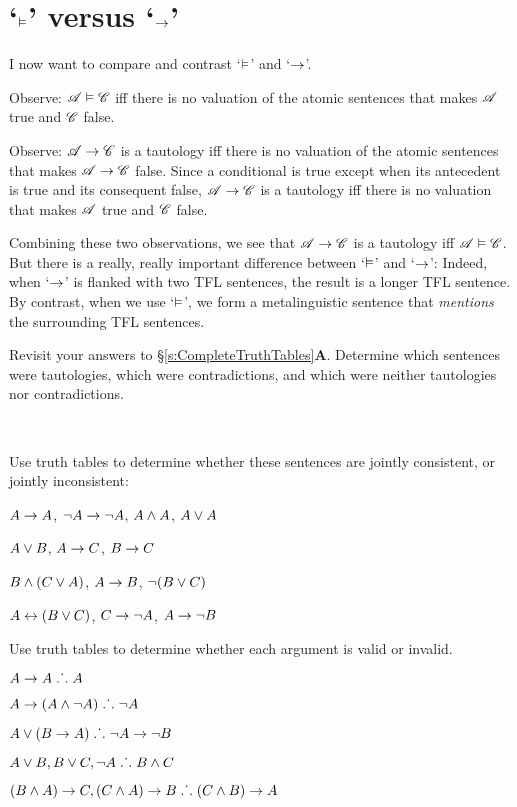 \section{`$\vDash$' versus `$\rightarrow$'}
I now want to compare and contrast `$\vDash$' and `$\rightarrow$'. 

Observe: $\mathscr{A} \vDash \mathscr{C}$ iff there is no valuation of the atomic sentences that makes $\mathscr{A}$ true and $\mathscr{C}$ false. 

Observe: $\mathscr{A} \rightarrow \mathscr{C}$ is a tautology iff there is no valuation of the atomic sentences that makes $\mathscr{A} \rightarrow \mathscr{C}$ false. Since a conditional is true except when its antecedent is true and its consequent false, $\mathscr{A} \rightarrow \mathscr{C}$ is a tautology iff there is no valuation that makes $\mathscr{A}$ true and $\mathscr{C}$ false. 

Combining these two observations, we see that $\mathscr{A} \rightarrow \mathscr{C}$  is a tautology iff  $\mathscr{A} \vDash \mathscr{C}$. But there is a really, really important difference between `$\vDash$' and `$\rightarrow$':
Indeed, when `$\rightarrow$' is flanked with two TFL sentences, the result is a longer TFL sentence. By contrast, when we use `$\vDash$', we form a metalinguistic sentence that \emph{mentions} the surrounding TFL sentences. 


\practiceproblems
\problempart
Revisit your answers to \S\ref{s:CompleteTruthTables}\textbf{A}. Determine which sentences were tautologies, which were contradictions, and which were neither tautologies nor contradictions.
\solutions

\

\problempart
\label{pr.TT.consistent}
Use truth tables to determine whether these sentences are jointly consistent, or jointly inconsistent:
\begin{earg}
\item $A\rightarrow A$, $\neg A \rightarrow \neg A$, $A\wedge A$, $A\vee A$ %
\item $A\vee B$, $A\rightarrow C$, $B\rightarrow C$ %
\item $B\wedge(C\vee A)$, $A\rightarrow B$, $\neg(B\vee C)$  %
\item $A\leftrightarrow(B\vee C)$, $C\rightarrow \neg A$, $A\rightarrow \neg B$ %
\end{earg}


\solutions
\problempart
\label{pr.TT.valid}
Use truth tables to determine whether each argument is valid or invalid.
\begin{earg}
\item $A\rightarrow A \mathrel{\ldotp\dot{}\,\ldotp} A$ %
\item $A\rightarrow(A\wedge\neg A) \mathrel{\ldotp\dot{}\,\ldotp} \neg A$ %
\item $A\vee(B\rightarrow A) \mathrel{\ldotp\dot{}\,\ldotp} \neg A \rightarrow \neg B$ %
\item $A\vee B, B\vee C, \neg A \mathrel{\ldotp\dot{}\,\ldotp} B \wedge C$ %
\item $(B\wedge A)\rightarrow C, (C\wedge A)\rightarrow B \mathrel{\ldotp\dot{}\,\ldotp} (C\wedge B)\rightarrow A$ %
\end{earg}

